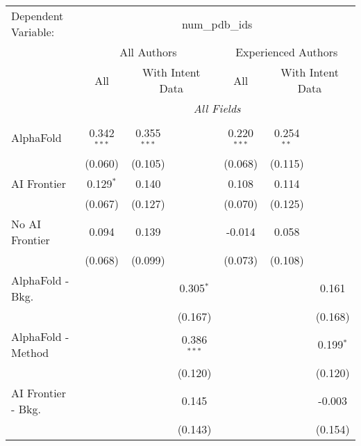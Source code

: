 \begingroup
\centering
\begin{tabular}{lcccccc}
   \tabularnewline \midrule \midrule
   Dependent Variable: & \multicolumn{6}{c}{num\_pdb\_ids}\\
 & \multicolumn{3}{c}{All Authors} & \multicolumn{3}{c}{Experienced Authors} \\
\cmidrule(lr){2-4} \cmidrule(lr){5-7}
 & \multicolumn{1}{c}{All} & \multicolumn{2}{c}{With Intent Data} & \multicolumn{1}{c}{All} & \multicolumn{2}{c}{With Intent Data} \\
\cmidrule(lr){2-2} \cmidrule(lr){3-4} \cmidrule(lr){5-5} \cmidrule(lr){6-7}
 & \multicolumn{6}{c}{\textit{All Fields}} \\ \\
   AlphaFold               & 0.342$^{***}$ & 0.355$^{***}$ &               & 0.220$^{***}$ & 0.254$^{**}$ &   \\   
                           & (0.060)       & (0.105)       &               & (0.068)       & (0.115)      &   \\   
   AI Frontier             & 0.129$^{*}$   & 0.140         &               & 0.108         & 0.114        &   \\   
                           & (0.067)       & (0.127)       &               & (0.070)       & (0.125)      &   \\   
   No AI Frontier          & 0.094         & 0.139         &               & -0.014        & 0.058        &   \\   
                           & (0.068)       & (0.099)       &               & (0.073)       & (0.108)      &   \\   
   AlphaFold - Bkg.        &               &               & 0.305$^{*}$   &               &              & 0.161\\   
                           &               &               & (0.167)       &               &              & (0.168)\\   
   AlphaFold - Method      &               &               & 0.386$^{***}$ &               &              & 0.199$^{*}$\\   
                           &               &               & (0.120)       &               &              & (0.120)\\   
   AI Frontier - Bkg.      &               &               & 0.145         &               &              & -0.003\\   
                           &               &               & (0.143)       &               &              & (0.154)\\   

\end{tabular}
